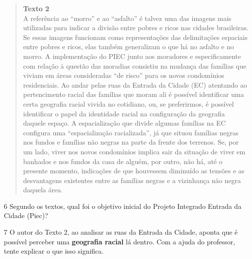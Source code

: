 \begin{quote}
\textbf{Texto 2}\\
A referência ao “morro” e ao “asfalto” é talvez uma das imagens mais
utilizadas para indicar a divisão entre pobres e ricos nas cidades
brasileiras. Se essas imagens funcionam como representações das
delimitações espaciais entre pobres e ricos, elas também generalizam o
que há no asfalto e no morro. A implementação do PIEC junto aos
moradores e especificamente com relação à questão das moradias consistiu
na mudança das famílias que viviam em áreas consideradas “de risco”
para os novos condomínios residenciais. Ao andar pelas ruas da Entrada
da Cidade (EC) atentando ao pertencimento racial das famílias que moram
ali é possível identificar uma certa geografia racial vivida no
cotidiano, ou, se preferirmos, é possível identificar o papel da
identidade racial na configuração da geografia daquele espaço. A
espacialização que divide algumas famílias na EC configura uma
“espacialização racializada”, já que situou famílias negras nos fundos
e famílias não negras na parte da frente dos terrenos. Se, por um lado,
viver nos novos condomínios implica sair da situação de viver em
banhados e nos fundos da casa de alguém, por outro, não há, até o
presente momento, indicações de que houvessem diminuído as tensões e as
desvantagens existentes entre as famílias negras e a vizinhança
não negra daquela área.

\end{quote}

\pagebreak
\num{6} Segundo os textos, qual foi o objetivo inicial do Projeto Integrado
Entrada da Cidade (Piec)?


\num{7} O autor do Texto 2, ao analisar as ruas da Entrada da Cidade, aponta que
é possível perceber uma \textbf{geografia racial} lá dentro. Com a ajuda
do professor, tente explicar o que isso significa.


